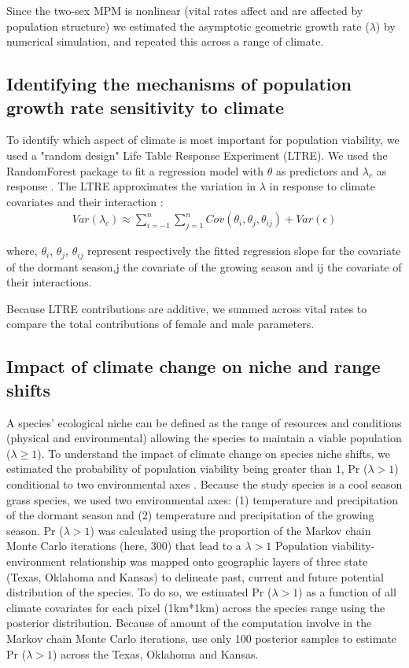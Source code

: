 \documentclass[12pt]{article}
\begin{document}
Since the two-sex MPM is nonlinear (vital rates affect and are affected by population structure) we estimated the asymptotic geometric growth rate ($\lambda$) by numerical simulation, and repeated this across a range of climate.

\subsection*{Identifying the mechanisms of population growth rate sensitivity to climate }
To identify which aspect of climate is most important for population viability, we used a "random design" Life Table Response Experiment (LTRE). 
We used the RandomForest package to fit a regression model with $\theta$ as predictors  and $\lambda_{c}$ as response \citep{ellner2016data,liaw2002classification}.
The LTRE approximates the variation in $\lambda$ in response to climate covariates and their interaction \citep{caswell2000matrix,hernandez2023exact}:
\begin{align}\label{eq:ltre}
Var(\lambda_{c})\approx \sum_{i=-1}^{n}\sum_{j=1}^{n} Cov(\theta_{i},\theta_{j},\theta_{ij}) + Var (\epsilon)
\end{align}

\noindent where, $\theta_{i}$, $\theta_{j}$, $\theta_{ij}$  represent respectively the fitted regression slope for the covariate of the dormant season,j the covariate of the growing season and ij the covariate of their interactions. 

Because LTRE contributions are additive, we summed across vital rates to compare the total contributions of female and male parameters. 

\subsection*{Impact of climate change on niche and range shifts}
A species' ecological niche can be defined as the range of resources and conditions (physical and environmental) allowing the species to maintain a viable population ($\lambda \geq 1$).
To understand the impact of climate change on species niche shifts, we estimated the probability of  population viability being greater than  1, Pr ($\lambda > 1$) conditional to two environmental axes \citep{diez2014probabilistic}.
Because the study species is a cool season grass species, we used two environmental axes: (1) temperature and precipitation of the dormant season and (2) temperature and precipitation of the growing season. 
Pr ($\lambda > 1$) was calculated using the proportion of the Markov chain Monte Carlo iterations (here, 300) that lead to a $\lambda > 1$
Population viability-environment relationship was mapped onto geographic layers of three state (Texas, Oklahoma and Kansas) to delineate past, current and future potential distribution of the species.
To do so, we estimated Pr ($\lambda > 1$) as a function of all climate covariates for each pixel (1km*1km) across the species range using the posterior distribution. 
Because of amount of the computation involve in the Markov chain Monte Carlo iterations, use only 100 posterior samples to estimate Pr ($\lambda > 1$) across the Texas, Oklahoma and Kansas.
\end{document}
